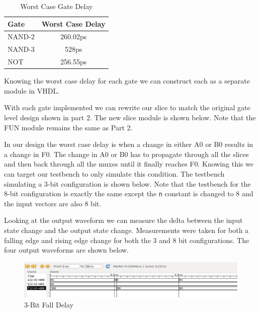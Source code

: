 \documentclass{article}
\begin{document}
\begin{table}[H]
    \centering
    \begin{tabular}{lc}
        \toprule
        \textbf{Gate} & \textbf{Worst Case Delay} \\
        \midrule
        NAND-2 & 260.02ps \\
        NAND-3 & 528ps \\
        NOT    & 256.55ps \\
        \bottomrule
    \end{tabular}
    \caption{Worst Case Gate Delay}
\end{table}

\newpage
Knowing the worst case delay for each gate we can construct each as a separate module in VHDL.





With each gate implemented we can rewrite our slice to match the original gate
level design shown in part 2. The new slice module is shown below. Note that
the FUN module remains the same as Part 2.



\newpage
In our design the worst case delay is when a change in either A0 or B0 results in a change
in F0. The change in A0 or B0 has to propagate through all the slices and then back through
all the muxes until it finally reaches F0. Knowing this we can target our testbench to only
simulate this condition. The testbench simulating a 3-bit configuration is shown below. Note
that the testbench for the 8-bit configuration is exactly the same except the \texttt{n} constant
is changed to 8 and the input vectors are also 8 bit.



Looking at the output waveform we can measure the delta between the input state
change and the output state change. Measurements were taken for both a falling
edge and rising edge change for both the 3 and 8 bit configurations. The four
output waveforms are shown below.

\begin{figure}[H]
    \centering
    \includegraphics[width=\linewidth]{../part_4/fun_3_fall.png}
    \caption{3-Bit Fall Delay}
\end{figure}
\end{document}
